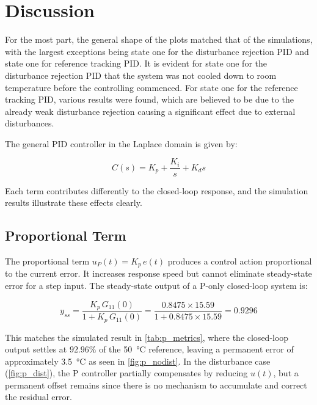\section{Discussion}

For the most part, the general shape of the plots matched that of the simulations, with the largest exceptions being state one for the disturbance rejection PID and state one for reference tracking PID.
It is evident for state one for the disturbance rejection PID that the system was not cooled down to room temperature before the controlling commenced.
For state one for the reference tracking PID, various results were found, which are believed to be due to the already weak disturbance rejection causing a significant effect due to external disturbances.

The general PID controller in the Laplace domain is given by:

\begin{equation}
    C(s) = K_p + \frac{K_i}{s} + K_d s
    \label{eq:pid}
\end{equation}

Each term contributes differently to the closed-loop response, and the simulation results illustrate these effects clearly.

\subsection{Proportional Term}

The proportional term $u_P(t) = K_p\,e(t)$ produces a control action proportional to the current error.
It increases response speed but cannot eliminate steady-state error for a step input.
The steady-state output of a P-only closed-loop system is:

\begin{equation}
    y_{ss} = \frac{K_p\,G_{11}(0)}{1 + K_p\,G_{11}(0)} = \frac{0.8475 \times 15.59}{1 + 0.8475 \times 15.59} = 0.9296
    \label{eq:p_ss}
\end{equation}

This matches the simulated result in \cref{tab:p_metrics}, where the closed-loop output settles at $92.96\%$ of the \SI{50}{\degreeCelsius} reference, leaving a permanent error of approximately \SI{3.5}{\degreeCelsius} as seen in \cref{fig:p_nodist}.
In the disturbance case (\cref{fig:p_dist}), the P controller partially compensates by reducing $u(t)$, but a permanent offset remains since there is no mechanism to accumulate and correct the residual error.

